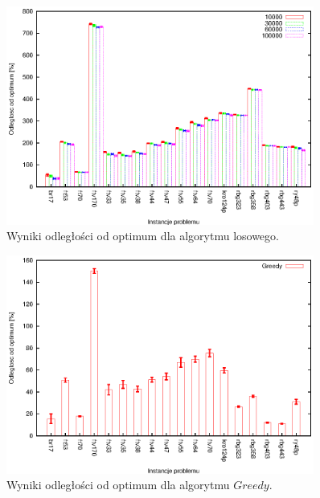 \begin{figure}
\begin{center}
\includegraphics[width=0.9\textwidth]{wykresy/random1}
\end{center}
\caption{Wyniki odległości od optimum dla algorytmu losowego.}
\label{random1}
\end{figure}

\begin{figure}
\begin{center}
\includegraphics[width=0.9\textwidth]{wykresy/greedy_1}
\end{center}
\caption{Wyniki odległości od optimum dla algorytmu $Greedy$.}
\label{greedy_1}
\end{figure}

